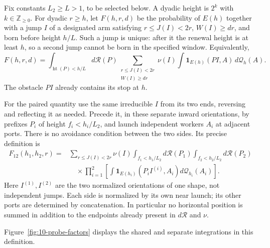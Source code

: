 Fix constants \(L_2\ge L>1\), to be selected below. A dyadic height is $2^k$ with $k\in\mathbb Z_{\ge0}$. For dyadic \(r\ge h\),
let \(F(h,r,d)\) be the probability of \(E(h)\) together with a jump
\(I\) of a designated arm satisfying \(r\le J(I)<2r\), \(W(I)\ge dr\),
and born before height \(h/L\). Such a jump is unique: after it the renewal height is at least $h$, so a second jump cannot be born in the specified window. Equivalently,
\begin{equation}
 F(h,r,d)=
 \int_{\operatorname{ht}(P)<h/L}\!d\mathcal R(P)
 \sum_{\substack{r\le J(I)<2r\\W(I)\ge dr}}\nu(I)
 \int \mathbf1_{E(h)}(PI,A)\,d\mathcal Q_h(A).
 \label{eq:10-F-integral}
\end{equation}
The obstacle \(PI\) already contains its stop at \(h\).

For the paired quantity use the same irreducible \(I\) from its two ends,
reversing and reflecting it as needed. Precede it, in these separate
inward orientations, by prefixes \(P_i\) of height \(f_i<h_i/L_2\),
and launch independent workers \(A_i\) at adjacent ports. There is no
avoidance condition between the two sides. Its precise definition is
\begin{equation}
 \begin{split}
 F_{12}(h_1,h_2,r)
 ={}&\sum_{r\le J(I)<2r}\nu(I)
 \int_{f_1<h_1/L_2}\!d\mathcal R(P_1)
 \int_{f_2<h_2/L_2}\!d\mathcal R(P_2)\\[-2mm]
 &\quad\times\prod_{i=1}^2
 \left[\int\mathbf1_{E(h_i)}(P_iI^{(i)},A_i)
                    d\mathcal Q_{h_i}(A_i)\right].
 \end{split}
 \label{eq:10-paired-integral}
\end{equation}
Here \(I^{(1)},I^{(2)}\) are the two normalized orientations of one shape,
not independent jumps. Each side is normalized by its own near launch;
its other ports are determined by concatenation. In particular no
horizontal position is summed in addition to the endpoints already
present in \(d\mathcal R\) and \(\nu\).

Figure~\ref{fig:10-probe-factors} displays the shared and separate
integrations in this definition.

